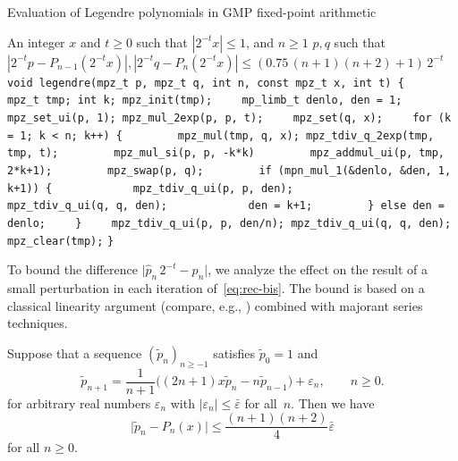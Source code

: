 \documentclass[nohypdvips,review]{siamart0216}
\newcommand{\abs}[1]{\mathopen| #1 \mathclose|}
\begin{document}
\begin{algorithm}[h]
  \caption{Evaluation of Legendre polynomials in GMP fixed-point arithmetic}
  \small
  \label{alg:gmprec}
  \begin{algorithmic}[1]
    \Require An integer $x$ and $t \ge 0$ such that $|2^{-t} x| \le 1$, and $n \ge 1$
    \Ensure $p, q$ such that $|2^{-t} p - P_{n-1}(2^{-t} x)|, |2^{-t} q - P_{n}(2^{-t} x)| \le (0.75 \, (n+1)(n+2) + 1) \, 2^{-t}$
\State \verb!void legendre(mpz_t p, mpz_t q, int n, const mpz_t x, int t) {!
\State \verb!    mpz_t tmp; int k; mpz_init(tmp);!
\State \verb!    mp_limb_t denlo, den = 1;!
\State \verb!    mpz_set_ui(p, 1); mpz_mul_2exp(p, p, t);!
\State \verb!    mpz_set(q, x);!
\State \verb!    for (k = 1; k < n; k++) {!
\State \verb!        mpz_mul(tmp, q, x); mpz_tdiv_q_2exp(tmp, tmp, t);!
\State \verb!        mpz_mul_si(p, p, -k*k)!
\State \verb!        mpz_addmul_ui(p, tmp, 2*k+1);!
\State \verb!        mpz_swap(p, q);!
\State \verb!        if (mpn_mul_1(&denlo, &den, 1, k+1)) {!
\State \verb!            mpz_tdiv_q_ui(p, p, den);!
\State \verb!            mpz_tdiv_q_ui(q, q, den);!
\State \verb!            den = k+1;!
\State \verb!        } else den = denlo;!
\State \verb!    }!
\State \verb!    mpz_tdiv_q_ui(p, p, den/n); mpz_tdiv_q_ui(q, q, den);!
\State \verb!    mpz_clear(tmp);!
\State \verb!}!
  \end{algorithmic}
\end{algorithm}

To bound the difference $\abs{\hat p_n \, 2^{-t} - p_n}$, we analyze
the effect on the result of a small perturbation in each iteration
of \cref{eq:rec-bis}.
The bound is based on a classical linearity argument (compare, e.g.,
\cite{Wimp1984}) combined with majorant series techniques.

\begin{proposition} \label{prop:rec-error}
Suppose that a sequence $(\tilde p_n)_{n \geq -1}$ satisfies
$\tilde p_0 = 1$ and
\begin{equation} \label{eq:rec-pert}
  \tilde{p}_{n + 1} =
    \frac{1}{n+1}
    \bigl( (2n +1) x \tilde{p}_n - n \tilde{p}_{n-1} \bigr)
    + \varepsilon_n,
  \qquad n \geq 0.
\end{equation}
for arbitrary real numbers $\varepsilon_n$
with $\abs{\varepsilon_n} \leq \bar\varepsilon$ for all $n$.
Then we have
\[
  \abs{\tilde p_n  - P_n(x)}
  \leq \frac{(n+1)(n+2)}{4} \bar \varepsilon
\]
for all $n \geq 0$.
\end{proposition}
\end{document}
